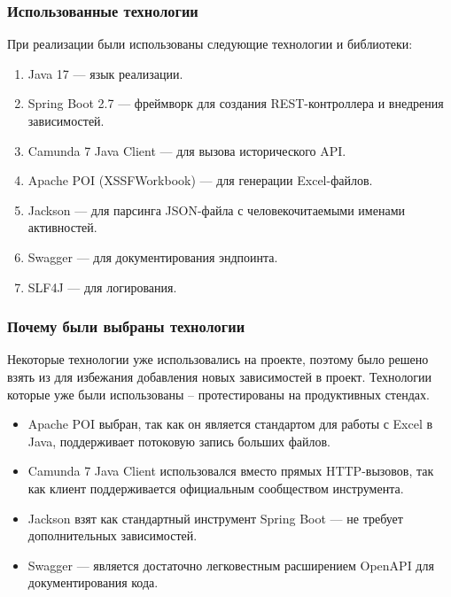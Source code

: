 \subsubsection{Использованные технологии}

При реализации были использованы следующие технологии и библиотеки:

\begin{enumerate}
  \item Java 17 — язык реализации.
  \item Spring Boot 2.7 — фреймворк для создания REST-контроллера и внедрения зависимостей.
  \item Camunda 7 Java Client — для вызова исторического API.
  \item Apache POI (XSSFWorkbook) — для генерации Excel-файлов.
  \item Jackson — для парсинга JSON-файла с человекочитаемыми именами активностей.
  \item Swagger — для документирования эндпоинта.
  \item SLF4J — для логирования.
\end{enumerate}

\subsubsection{Почему были выбраны технологии}

Некоторые технологии уже использовались на проекте, поэтому было решено взять из для избежания добавления новых зависимостей в проект. Технологии которые уже были использованы -- протестированы на продуктивных стендах.

\begin{itemize}
  \item Apache POI выбран, так как он является стандартом для работы с Excel в Java, поддерживает потоковую запись больших файлов.

  \item Camunda 7 Java Client использовался вместо прямых HTTP-вызовов, так как клиент поддерживается официальным сообществом инструмента.

  \item Jackson взят как стандартный инструмент Spring Boot — не требует дополнительных зависимостей.

  \item Swagger — является достаточно легковестным расширением OpenAPI для документирования кода.
\end{itemize}

